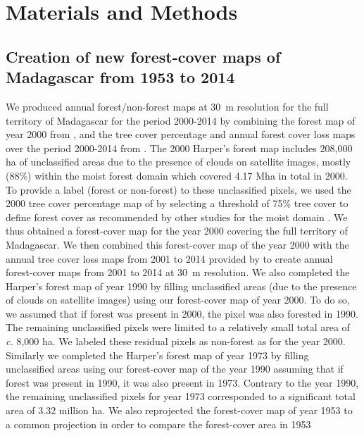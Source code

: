 \documentclass[a4paper, 12pt, leqno]{article} %
\begin{document}
\newpage

\section{Materials and Methods}
\label{materials-and-methods}

\subsection{Creation of new forest-cover maps of Madagascar from
1953 to 2014}

We produced annual forest/non-forest maps at 30~m resolution for the
full territory of Madagascar for the period 2000-2014 by combining the
forest map of year 2000 from \citet{Harper2007}, and the tree cover
percentage and annual forest cover loss maps over the period 2000-2014
from \citet{Hansen2013}. The 2000 Harper's forest map includes 208,000
ha of unclassified areas due to the presence of clouds on satellite
images, mostly (88\%) within the moist forest domain which covered
4.17 Mha in total in 2000. To provide a label (forest or non-forest)
to these unclassified pixels, we used the 2000 tree cover percentage
map of \citet{Hansen2013} by selecting a threshold of 75\% tree cover
to define forest cover as recommended by other studies for the moist
domain \citep{Achard2014}. We thus obtained a forest-cover map for the
year 2000 covering the full territory of Madagascar. We then combined
this forest-cover map of the year 2000 with the annual tree cover loss
maps from 2001 to 2014 provided by \citet{Hansen2013} to create annual
forest-cover maps from 2001 to 2014 at 30~m resolution. We also
completed the Harper's forest map of year 1990 by filling unclassified
areas (due to the presence of clouds on satellite images) using our
forest-cover map of year 2000. To do so, we assumed that if forest was
present in 2000, the pixel was also forested in 1990. The remaining
unclassified pixels were limited to a relatively small total area of
\emph{c.} 8,000 ha. We labeled these residual pixels as non-forest as
for the year 2000. Similarly we completed the Harper's forest map of
year 1973 by filling unclassified areas using our forest-cover map of
the year 1990 assuming that if forest was present in 1990, it was also
present in 1973. Contrary to the year 1990, the remaining unclassified
pixels for year 1973 corresponded to a significant total area of 3.32
million ha. We also reprojected the forest-cover map of year 1953 to a
common projection in order to compare the forest-cover area in 1953
\end{document}
